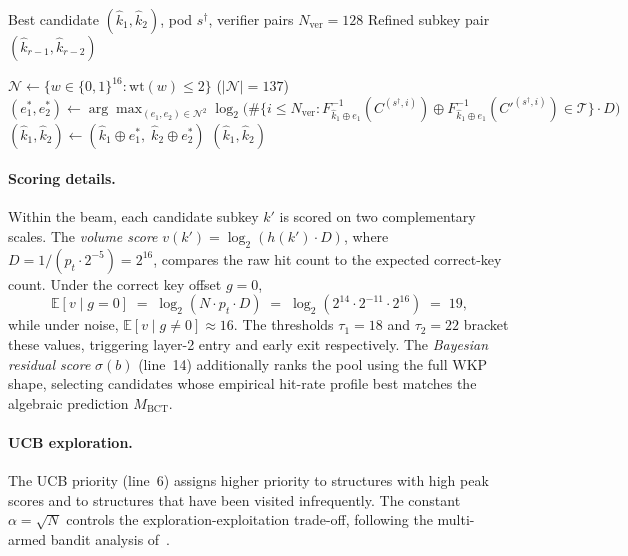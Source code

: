 \documentclass[runningheads]{llncs}
\newcommand{\xor}{\oplus}
\begin{document}
\begin{algorithm}[t]
\caption{Verifier: Hamming-$\le 2$ Neighbourhood Refinement (Phase 3)}
\label{alg:verifier}
\begin{algorithmic}[1]
\Require Best candidate $(\hat{k}_1, \hat{k}_2)$, pod $s^{\dag}$,
         verifier pairs $N_{\mathrm{ver}} = 128$
\Ensure Refined subkey pair $(\hat{k}_{r-1}, \hat{k}_{r-2})$

\State $\mathcal{N} \gets \{w \in \{0,1\}^{16} : \mathrm{wt}(w) \le 2\}$
       \quad ($|\mathcal{N}| = 137$)
\Repeat
  \State $(e_1^*, e_2^*) \gets \arg\max_{(e_1,e_2)\in\mathcal{N}^2}
         \log_2\!\bigl(\#\{i \le N_{\mathrm{ver}} :
         F_{\hat{k}_1 \xor e_1}^{-1}(C^{(s^{\dag},i)}) \xor
         F_{\hat{k}_1 \xor e_1}^{-1}(C'^{(s^{\dag},i)}) \in
         \mathcal{T}\} \cdot D\bigr)$
  \State $(\hat{k}_1, \hat{k}_2) \gets
         (\hat{k}_1 \xor e_1^*,\; \hat{k}_2 \xor e_2^*)$
\Return $(\hat{k}_1, \hat{k}_2)$
\end{algorithmic}
\end{algorithm}

\paragraph{Scoring details.}
Within the beam, each candidate subkey $k'$ is scored on two complementary
scales.  The \emph{volume score} $v(k') = \log_2(h(k') \cdot D)$, where
$D = 1 / (p_t \cdot 2^{-5}) = 2^{16}$, compares the raw hit count to
the expected correct-key count.  Under the correct key offset $g = 0$,
\[
  \mathbb{E}[v \mid g = 0] \;=\; \log_2(N \cdot p_t \cdot D) \;=\;
  \log_2(2^{14} \cdot 2^{-11} \cdot 2^{16}) \;=\; 19,
\]
while under noise, $\mathbb{E}[v \mid g \ne 0] \approx 16$.  The
thresholds $\tau_1 = 18$ and $\tau_2 = 22$ bracket these values,
triggering layer-2 entry and early exit respectively.  The
\emph{Bayesian residual score} $\sigma(b)$ (line~14) additionally
ranks the pool using the full WKP shape, selecting candidates whose
empirical hit-rate profile best matches the algebraic prediction
$M_{\mathrm{BCT}}$.

\paragraph{UCB exploration.}
The UCB priority (line~6) assigns higher priority to structures with
high peak scores and to structures that have been visited infrequently.
The constant $\alpha = \sqrt{N}$ controls the exploration-exploitation
trade-off, following the multi-armed bandit analysis of~\cite{ACF02}.
\end{document}
